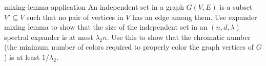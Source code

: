 \begin{exercise-prob}
\begin{show-ps3}{mixing-lemma-application}
An independent set in a graph $G(V,E)$ is a subset $V' \subseteq V$ such that no pair of vertices in $V$ has an edge among them. Use expander mixing lemma to show that the size of the independent set in an $(n,d,\lambda)$ spectral expander is at most $\lambda_2 n$. Use this to show that the chromatic number (the minimum number of colors required to properly color the graph vertices of $G$) is at least $1/\lambda_2$.
\end{show-ps3}
\end{exercise-prob}